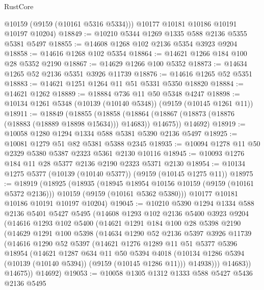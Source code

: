 \begin{lexlean}{RustCore}
\begin{coremodule}
        @10159
        (@9159 (@10161 @5316 @5334)))
      @10177
      @10181
      @10186
      @10191
      @10197
      @10204)
@18849 := @10210 @5344 @1269 @1335 @588 @2136 @5355 @5381 @5497
@18855 := @14608 @1268 @102 @2136 @5354 @3923 @9204
@18858 := @14616 @1268 @102 @5354
@18864 := @14621 @1266 @184 @100 @28 @5352 @2190
@18867 := @14629 @1266 @100 @5352
@18873 := @14634 @1265 @52 @2136 @5351 @3926 @11739
@18876 := @14616 @1265 @52 @5351
@18883 := @14621 @1251 @1264 @11 @51 @5331 @5350 @18820
@18884 := @14621 @1262
@18889 := @18884 @736 @11 @50 @5348 @4247
@18898 := @10134 @1261 @5348 (@10139 (@10140 @5348)) (@9159 (@10145 @1261 @11))
@18911 := @18849
    (@18855
      (@18858 (@18864 (@18867 (@18873 (@18876 (@18883 (@18889 @18898 @15634))) @14683)) @14675))
      @14692)
@18919 := @10058 @1280 @1294 @1334 @588 @5381 @5390 @2136 @5497
@18925 := @10081 @1279 @51 @82 @5381 @5388 @2345
@18935 := @10094 @1278 @11 @50 @2329 @5380 @5387 @2323 @5361 @2130 @10116
@18945 := @10093 @1276 @184 @11 @28 @5377 @2136 @2190 @2323 @5371 @2130
@18954 := @10134 @1275 @5377 (@10139 (@10140 @5377)) (@9159 (@10145 @1275 @11))
@18975 := @18919
    (@18925
      (@18935
        (@18945 @18954 @10156 @10159 (@9159 (@10161 @5372 @2136)))
        @10159
        (@9159 (@10161 @5362 @5380)))
      @10177
      @10181
      @10186
      @10191
      @10197
      @10204)
@19045 := @10210
    @5390
    @1294
    @1334
    @588
    @2136
    @5401
    @5427
    @5495
    (@14608
      @1293
      @102
      @2136
      @5400
      @3923
      @9204
      (@14616
        @1293
        @102
        @5400
        (@14621
          @1291
          @184
          @100
          @28
          @5398
          @2190
          (@14629
            @1291
            @100
            @5398
            (@14634
              @1290
              @52
              @2136
              @5397
              @3926
              @11739
              (@14616
                @1290
                @52
                @5397
                (@14621
                  @1276
                  @1289
                  @11
                  @51
                  @5377
                  @5396
                  @18954
                  (@14621
                    @1287
                    @634
                    @11
                    @50
                    @5394
                    @4018
                    (@10134 @1286 @5394 (@10139 (@10140 @5394)) (@9159 (@10145 @1286 @11)))
                    @14938)))
              @14683))
          @14675))
      @14692)
@19053 := @10058 @1305 @1312 @1333 @588 @5427 @5436 @2136 @5495

\end{coremodule}
\end{lexlean}
